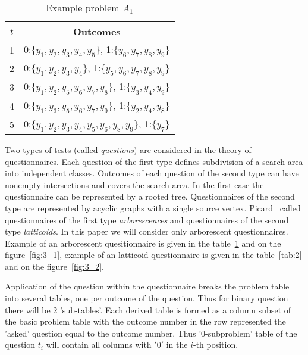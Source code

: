 \documentclass[11pt]{article}
\begin{document}
\begin{table}[ht]
\begin{center}
\begin{tabular}{|c||c|} \hline
$t$ & \textsf{Outcomes} \\ \hline\hline
1 & 0:$\{y_1, y_2, y_3, y_4, y_5\}$, 1:$\{y_6, y_7, y_8, y_9\}$ \\ \hline
2 & 0:$\{y_1, y_2, y_3, y_4\}$, 1:$\{y_5, y_6, y_7, y_8, y_9\}$ \\ \hline
3 & 0:$\{y_1, y_2, y_5, y_6, y_7, y_8\}$, 1:$\{y_3, y_4, y_9\}$ \\ \hline
4 & 0:$\{y_1, y_3, y_5, y_6, y_7, y_9\}$, 1:$\{y_2, y_4, y_8\}$ \\ \hline
5 & 0:$\{y_1, y_2, y_3, y_4, y_5, y_6, y_8, y_9\}$, 1:$\{y_7\}$ \\ \hline
\end{tabular}
\end{center}
\caption{Example problem $A_1$\label{tab:1}}
\end{table}

\begin{figure*}[htbp]
\begin{center} 
\setlength{\unitlength}{0.254mm}

\caption{Example of arborescence for the task in the table~\ref{tab:1}}
\label{fig:3_1}
\end{center} 
\end{figure*}

Two types of tests (called \emph{questions}) are considered in the theory of questionnaires. Each question of the first type defines subdivision of a search area into independent classes. Outcomes of each question of the second type can have nonempty intersections and covers the search area. In the first case the questionnaire can be represented by a rooted tree. Questionnaires of the second type are represented by acyclic graphs with a single source vertex. Picard~\cite{Pi:geq} called questionnaires of the first type \emph{arborescences} and questionnaires of the second type \emph{latticoids}. In this paper we will consider only arborescent questionnaires. Example of an arborescent quesitionnaire is given in the table~\ref{tab:1} and on the figure~\ref{fig:3_1}, example of an latticoid questionnaire is given in the table~\ref{tab:2} and on the figure~\ref{fig:3_2}.

Application of the question within the questionnaire breaks the problem table into several tables, one per outcome of the question. Thus for binary question there will be 2 'sub-tables'. Each derived table is formed as a column subset of the basic problem table with the outcome number in the row represented the 'asked' question equal to the outcome number. Thus '$0$-subproblem' table of the question $t_i$ will contain all columns with $'0'$ in the $i$-th position.
\end{document}
